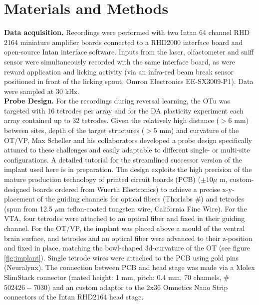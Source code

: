 \section{Materials and Methods}
\label{sec:MatAndMet}
\textbf{Data acquisition.} Recordings were performed with two Intan 64 channel RHD 2164 miniature amplifier boards connected to a RHD2000 interface board and open-source Intan interface software. Inputs from the laser, olfactometer and sniff sensor were simultaneously recorded with the same interface board, as were reward application and licking activity (via an infra-red beam break sensor positioned in front of the licking spout, Omron Electronics EE-SX3009-P1). Data were sampled at 30 kHz.\\\textbf{Probe Design.} For the recordings during reversal learning, the OTu was targeted with 16 tetrodes per array and for the DA plasticity experiment each array contained up to 32 tetrodes. Given the relatively high distance ($>6$ mm) between sites, depth of the target structures ($>5$ mm) and curvature of the OT/VP, Max Scheller and his collaborators developed a probe design specifically attuned to these challenges and easily adaptable to different single- or multi-site configurations. A detailed tutorial for the streamlined successor version of the implant used here is in preparation. The design exploits the high precision of the mature production technology of printed circuit boards (PCB)  ($\pm10\mu$ m, custom-designed boards ordered from Wuerth Electronics) to achieve a precise x-y-placement of the guiding channels for optical fibers (Thorlabs \#) and tetrodes (spun from 12.5 $\mu$m teflon-coated tungsten wire, California Fine Wire). For the VTA, four tetrodes were attached to an optical fiber and fixed in their guiding channel. For the OT/VP, the implant was placed above a mould of the ventral brain surface, and tetrodes and an optical fiber were advanced to their z-position and fixed in place, matching the bowl-shaped 3d-curvature of the OT (see figure \ref{fig:implant}). Single tetrode wires were attached to the PCB using gold pins (Neuralynx). The connection between PCB and head stage was made via a Molex SlimStack connector (mated height: 1 mm, pitch: 0.4 mm, 70 channels, \# $502426-7030$) and an custom adaptor to the 2x36 Omnetics Nano Strip connectors of the Intan RHD2164 head stage.\\ 

